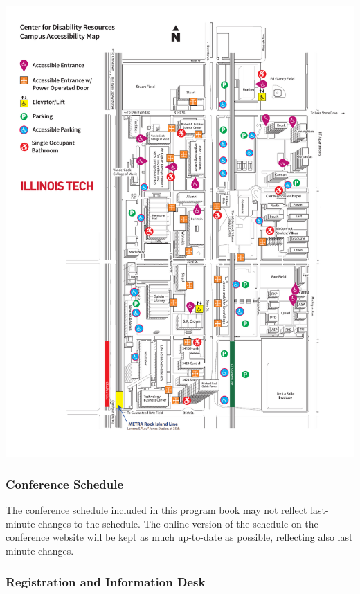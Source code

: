 \clearpage

\begin{center}
	\includegraphics[width = \textwidth] {Photos/mies-campus-accessibility-map-2022.pdf}
\end{center}




\subsubsection{Conference Schedule}

The conference schedule included in this program book may not reflect last-minute changes to the schedule. The online version of the schedule on the conference website
will be kept as much up-to-date as possible, reflecting also last minute changes. 

\subsubsection{Registration and Information Desk}

